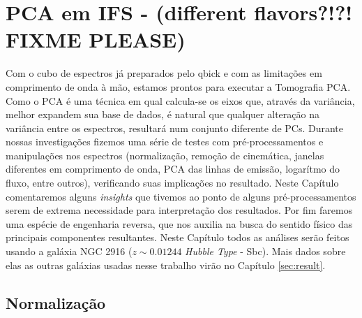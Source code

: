 



\chapter{PCA em IFS - (different flavors?!?! FIXME PLEASE)}
\label{sec:cap4}

\fixme Com o cubo de espectros já preparados pelo {\sc qbick} e com as limitações em comprimento de onda à mão, estamos
prontos para executar a Tomografia PCA. Como o PCA é uma técnica em qual calcula-se os eixos que, através da variância,
melhor expandem sua base de dados, é natural que qualquer alteração na variância entre os espectros, resultará num
conjunto diferente de PCs. Durante nossas investigações fizemos uma série de testes com pré-processamentos e
manipulações nos espectros (normalização, remoção de cinemática, janelas diferentes em comprimento de onda, PCA das
linhas de emissão, logarítmo do fluxo, entre outros), verificando suas implicações no resultado. Neste Capítulo
comentaremos alguns {\em insights} que tivemos ao ponto de alguns pré-processamentos serem de extrema necessidade para
interpretação dos resultados. Por fim faremos uma espécie de engenharia reversa, que nos auxilia na busca do sentido
físico das principais componentes resultantes. Neste Capítulo todos as análises serão feitos usando a galáxia NGC 2916
($z \sim 0.01244$ {\em Hubble Type} - Sbc). Mais dados sobre elas as outras galáxias usadas nesse trabalho virão no
Capítulo \ref{sec:result}.

\section{Normalização}
\label{sec:cap4:norm}

